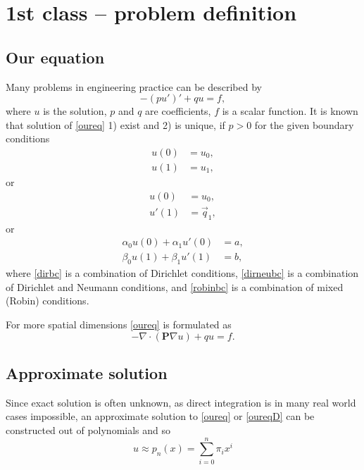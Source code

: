 
\chapter{1st class -- problem definition}

\section{Our equation}

Many problems in engineering practice can be described by 
\begin{equation}
\label{oureq}
 - (p u')' + q u = f,
\end{equation}
 where $u$ is the solution, $p$ and $q$ are coefficients, $f$ is a scalar function.  It is known that solution of \eqref{oureq} 1) exist and 2) is unique, if $p > 0$ for the given boundary conditions
 \begin{equation}
 \label{dirbc}
  \begin{split}
   u(0) &= u_{0}, \\
    u(1) & = u_{1},
  \end{split} 
 \end{equation}
or 
\begin{equation}
\label{dirneubc}
 \begin{split}
      u(0) &= u_{0}, \\
    u'(1) & = \vec{q}_{1},
 \end{split} 
\end{equation}
or 
\begin{equation}
\label{robinbc}
 \begin{split}
  \alpha_{0}u(0) + \alpha_{1}u'(0) &= a ,\\
     \beta_{0}u(1) + \beta_{1}u'(1) &= b ,
 \end{split} 
\end{equation}
where \eqref{dirbc} is a combination of Dirichlet conditions, \eqref{dirneubc} is a combination of Dirichlet and Neumann conditions, and \eqref{robinbc} is a combination of mixed (Robin) conditions.

For more spatial dimensions \eqref{oureq} is formulated as
\begin{equation}
\label{oureqD}
- \nabla \cdot (\mathbf{P} \nabla u)  + qu = f .
\end{equation}

\section{Approximate solution}
Since exact solution is often unknown, as direct integration is in 
many real world cases  impossible, an approximate solution to \eqref{oureq} or \eqref{oureqD} can be constructed out of polynomials and so
\begin{equation}
\label{bencheq}
 u \approx p_{n}(x) = \sum_{i=0}^{n}\pi_{i} x^{i} 
\end{equation}


